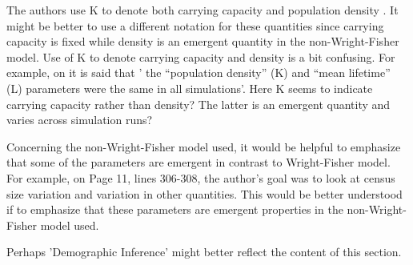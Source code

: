 
\begin{point}{}
    The authors use K to denote both carrying capacity 
    and population density . 
    It might be better to use a different notation for these quantities since carrying capacity is fixed while density is an emergent quantity in the non-Wright-Fisher model. Use of K to denote carrying capacity and density is a bit confusing. For example, on  it is said that ' the ``population density'' (K) and ``mean lifetime'' (L) parameters were the same in all simulations'. Here K seems to indicate carrying capacity rather than density? The latter is an emergent quantity and varies across simulation runs?
\end{point}


\begin{point}{}
    Concerning the non-Wright-Fisher model used, it would be helpful to emphasize that some of the parameters are emergent in contrast to Wright-Fisher model. For example, on Page 11, lines 306-308, the author's goal was to look at census size variation and variation in other quantities. This would be better understood if to emphasize that these parameters are emergent properties in the non-Wright-Fisher model used.
\end{point}


\begin{point}{\revref}
    Perhaps 'Demographic Inference' might better reflect the content of this section.
\end{point}

